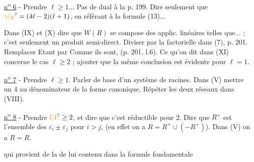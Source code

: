 \uline{n\textsuperscript{o} 6} - Prendre $\ell\geq 1$... Pas de dual à la p. 199. Dire seulement que $\unsure{\gamma|\chi}=(4\ell-2)(\ell+1)$, en référant à la formule (13)...

Dans (IX) et (X) dire que $W(R)$ se compose des applic. linéaires telles que... ; c'est seulement un produit semi-direct. Diviser par la factorielle dans (7), p. 201. Remplacer \textquotedbl{}Etant\textquotedbl{} par \textquotedbl{}Comme ils sont\textquotedbl{}, (p. 201, l.6). Ce qu'on dit dans (XI) concerne le cas $\ell\geq 2$ ; ajouter que la même conclusion est évidente pour $\ell=1$.

\uline{n\textsuperscript{o} 7} - Prendre $\ell\geq 1$. Parler de \textquotedbl{}base\textquotedbl{} d'un système de racines. Dans (V) mettre un 4 au dénominateur de la forme canonique. Répéter les deux réseaux dans (VIII). \handwritten{\unsure{--}}

\uline{n\textsuperscript{o} 8} - Prendre $\unsure{l|1}\geq 2$, et dire que c'est réductible pour 2. Dire que $R^+$ est l'ensemble des $\varepsilon_i\pm\varepsilon_j$ pour $i>j$, (en effet on a $R=R^+\cup(-R^+)$). Dans (V) on a $R=R$.


qui provient de la  de
lui contenu dans la formule fondamentale

